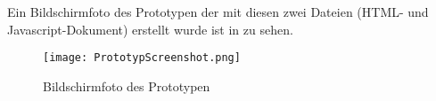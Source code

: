 Ein Bildschirmfoto des Prototypen der mit diesen zwei Dateien (HTML- und Javascript-Dokument) erstellt wurde ist in  zu sehen.

\begin{figure}[htb]
\centering
\texttt{[image: PrototypScreenshot.png]}
\caption[Protoyp Bildschirmfoto]{Bildschirmfoto des Prototypen}
\label{fig:PrototypScreenshot}
\end{figure}